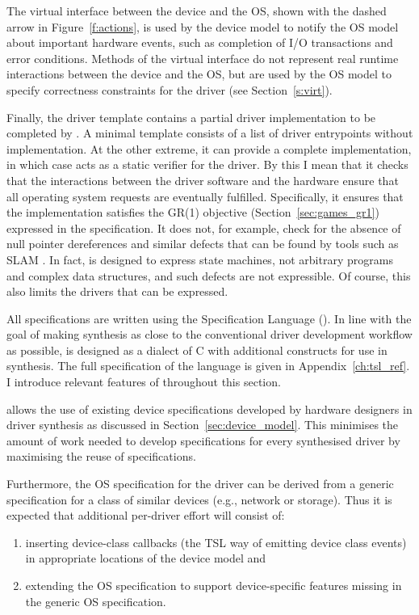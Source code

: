 The virtual interface between the device and the OS, shown with the dashed arrow in Figure~\ref{f:actions}, is used by the device model to notify the OS model about important hardware events, such as completion of I/O transactions and error conditions.  Methods of the virtual interface do not represent real runtime interactions between the device and the OS, but are used by the OS model to specify correctness constraints for the driver (see Section~\ref{s:virt}).

Finally, the driver template contains a partial driver implementation to be completed by \termite.  A minimal template consists of a list of driver entrypoints without implementation.  At the other extreme, it can provide a complete implementation, in which case \termite acts as a static verifier for the driver. By this I mean that it checks that the interactions between the driver software and the hardware ensure that all operating system requests are eventually fulfilled. Specifically, it ensures that the implementation satisfies the GR(1) objective (Section~\ref{sec:games_gr1}) expressed in the specification. It does not, for example, check for the absence of null pointer dereferences and similar defects that can be found by tools such as SLAM \cite{Ball_BKL_10}. In fact, \tsl is designed to express state machines, not arbitrary programs and complex data structures, and such defects are not expressible. Of course, this also limits the drivers that can be expressed.

All specifications are written using the \termite Specification Language (\tsl).  In line with the goal of making synthesis as close to the conventional driver development workflow as possible, \tsl is designed as a dialect of C with additional constructs for use in synthesis.  The full specification of the \tsl language is given in Appendix~\ref{ch:tsl_ref}. I introduce relevant features of \tsl throughout this section.

\termite allows the use of existing device specifications developed by hardware designers in driver synthesis as discussed in Section~\ref{sec:device_model}. This minimises the amount of work needed to develop specifications for every synthesised driver by maximising the reuse of specifications.  

Furthermore, the OS specification for the driver can be derived from a generic specification for a class of similar devices (e.g., network or storage).  Thus it is expected that additional per-driver effort will consist of: 
\begin{enumerate}
    \item inserting device-class callbacks (the TSL way of emitting device class events) in appropriate locations of the device model and 
    \item extending the OS specification to support device-specific features missing in the  generic OS specification.
\end{enumerate}

